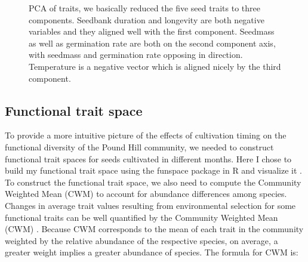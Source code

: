 \documentclass[a4paper, 11, margin=2cm]{article}
\begin{document}
      \begin{figure}[t]
        \centering
        \caption{PCA of traits, we basically reduced the five seed traits to three components. Seedbank duration and longevity are both negative variables and they aligned well with the first component. Seedmass as well as germination rate are both on the second component axis, with seedmass and germination rate opposing in direction. Temperature is a negative vector which is aligned nicely by the third component.}
      \end{figure}


    \subsection{Functional trait space}

    To provide a more intuitive picture of the effects of cultivation timing on the functional diversity of the Pound Hill community, we needed to construct functional trait spaces for seeds cultivated in different months. Here I chose to build my functional trait space using the funspace package in R and visualize it \citep{funspace}. To construct the functional trait space, we also need to compute the Community Weighted Mean (CWM) to account for abundance differences among species. Changes in average trait values resulting from environmental selection for some functional traits can be well quantified by the Community Weighted Mean (CWM) \citep{ricotta2011cwm}. Because CWM corresponds to the mean of each trait in the community weighted by the relative abundance of the respective species, on average, a greater weight implies a greater abundance of species. The formula for CWM is:
\end{document}
